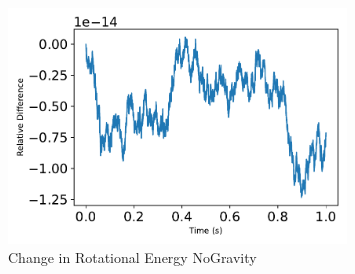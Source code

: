 \begin{figure}[htbp]\centerline{\includegraphics[width=0.8\textwidth]{AutoTeX/ChangeInRotationalEnergyNoGravity}}\caption{Change in Rotational Energy NoGravity}\label{fig:ChangeInRotationalEnergyNoGravity}\end{figure}